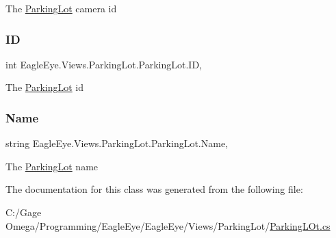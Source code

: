 The \mbox{\hyperlink{class_eagle_eye_1_1_views_1_1_parking_lot_1_1_parking_lot}{Parking\+Lot}} camera id 

\mbox{\label{class_eagle_eye_1_1_views_1_1_parking_lot_1_1_parking_lot_a577b278535b3599ca2aeb7ad17232f76}} 
\subsubsection{\texorpdfstring{ID}{ID}}
{\footnotesize\ttfamily int Eagle\+Eye.\+Views.\+Parking\+Lot.\+Parking\+Lot.\+ID\hspace{0.3cm}{\ttfamily [get]}, {\ttfamily [set]}}



The \mbox{\hyperlink{class_eagle_eye_1_1_views_1_1_parking_lot_1_1_parking_lot}{Parking\+Lot}} id 

\mbox{\label{class_eagle_eye_1_1_views_1_1_parking_lot_1_1_parking_lot_afad744515e8684f99befb40034fda405}} 
\subsubsection{\texorpdfstring{Name}{Name}}
{\footnotesize\ttfamily string Eagle\+Eye.\+Views.\+Parking\+Lot.\+Parking\+Lot.\+Name\hspace{0.3cm}{\ttfamily [get]}, {\ttfamily [set]}}



The \mbox{\hyperlink{class_eagle_eye_1_1_views_1_1_parking_lot_1_1_parking_lot}{Parking\+Lot}} name 



The documentation for this class was generated from the following file\+:\begin{DoxyCompactItemize}
\item 
C\+:/\+Gage Omega/\+Programming/\+Eagle\+Eye/\+Eagle\+Eye/\+Views/\+Parking\+Lot/\mbox{\hyperlink{_views_2_parking_lot_2_parking_lot_8cs}{Parking\+L\+Ot.\+cs}}\end{DoxyCompactItemize}
